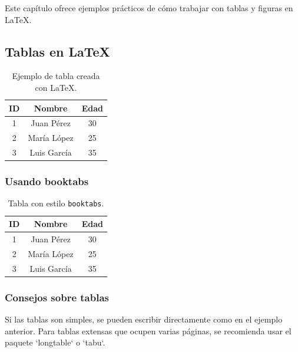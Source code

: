  Este capítulo ofrece ejemplos prácticos de cómo trabajar con tablas y figuras en \LaTeX.
 
  
  \subsection{Tablas en \LaTeX}
  
  \begin{table}[H] %
      \centering
      \begin{tabular}{|c|c|c|} %
          \hline
          \textbf{ID} & \textbf{Nombre} & \textbf{Edad} \\
          \hline
          1 & Juan Pérez  & 30 \\
          2 & María López & 25 \\
          3 & Luis García & 35 \\
          \hline
      \end{tabular}
      \caption{Ejemplo de tabla creada con \LaTeX.}
      \label{tab:ejemplo_tabla}
  \end{table}
  
 \subsubsection{Usando booktabs}

 \begin{table}[H]
   \centering
   \begin{tabular}{ccc}
     \toprule
     ID & Nombre & Edad \\
     \midrule
     1 & Juan Pérez  & 30 \\
     2 & María López & 25 \\
     3 & Luis García & 35 \\
     \bottomrule
   \end{tabular}
   \caption{Tabla con estilo \texttt{booktabs}.}
   \label{tab:booktabs}
 \end{table}
 
  \subsubsection{Consejos sobre tablas}
  Si las tablas son simples, se pueden escribir directamente como en el ejemplo anterior.  
  Para tablas extensas que ocupen varias páginas, se recomienda usar el paquete `longtable` o `tabu`.
 
